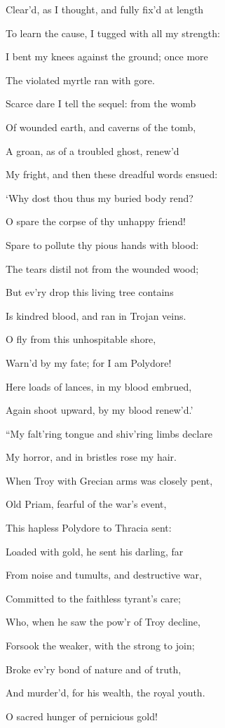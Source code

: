 Clear’d, as I thought, and fully fix’d at length

To learn the cause, I tugged with all my strength:

I bent my knees against the ground; once more

The violated myrtle ran with gore.

Scarce dare I tell the sequel: from the womb

Of wounded earth, and caverns of the tomb,

A groan, as of a troubled ghost, renew’d

My fright, and then these dreadful words ensued:

‘Why dost thou thus my buried body rend?

O spare the corpse of thy unhappy friend!

Spare to pollute thy pious hands with blood:

The tears distil not from the wounded wood;

But ev’ry drop this living tree contains

Is kindred blood, and ran in Trojan veins.

O fly from this unhospitable shore,

Warn’d by my fate; for I am Polydore!

Here loads of lances, in my blood embrued,

Again shoot upward, by my blood renew’d.’

“My falt’ring tongue and shiv’ring limbs declare

My horror, and in bristles rose my hair.

When Troy with Grecian arms was closely pent,

Old Priam, fearful of the war’s event,

This hapless Polydore to Thracia sent:

Loaded with gold, he sent his darling, far

From noise and tumults, and destructive war,

Committed to the faithless tyrant’s care;

Who, when he saw the pow’r of Troy decline,

Forsook the weaker, with the strong to join;

Broke ev’ry bond of nature and of truth,

And murder’d, for his wealth, the royal youth.

O sacred hunger of pernicious gold!


